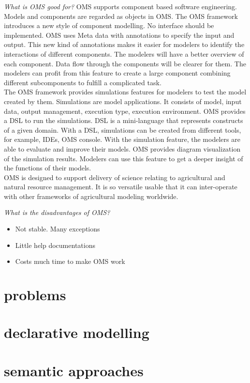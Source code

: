 \emph{What is OMS good for?}
OMS supports component based software engineering. Models and components are regarded as objects in OMS. The OMS framework introduces a new style of component modelling. No interface should be implemented. OMS uses Meta data with annotations to specify the input and output. This new kind of annotations makes it easier for modelers to identify the interactions of different components. The modelers will have a better overview of each component. Data flow through the components will be clearer for them. The modelers can profit from this feature to create a large component combining different subcomponents to fulfill a complicated task.\\
The OMS framework provides simulations features for modelers to test the model created by them. Simulations are model applications. It consists of model, input data, output management, execution type, execution environment. OMS provides a DSL to run the simulations. DSL is a mini-language that represents constructs of a given domain. With a DSL, simulations can be created from different tools, for example, IDEs, OMS console. With the simulation feature, the modelers are able to evaluate and improve their models.
OMS provides diagram visualization of the simulation results. Modelers can use this feature to get a deeper insight of the functions of their models.\\
OMS is designed to support delivery of science relating to agricultural and natural resource management. It is so versatile usable that it can inter-operate with other frameworks of agricultural modeling worldwide.

\emph{What is the disadvantages of OMS?}
\begin{itemize}
	\item Not stable. Many exceptions
	\item Little help documentations
	\item Costs much time to make OMS work
\end{itemize}

\section{problems}
\section{declarative modelling}
\section{semantic approaches}